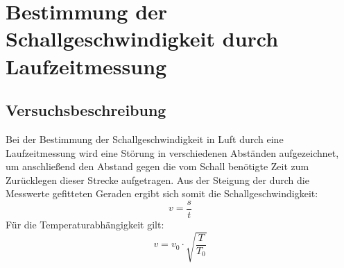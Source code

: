 \documentclass[12pt,a4paper]{article}
\author{Gruppe C14 \\ Julián Häck, Martin Koytek, Lars Wenning, Erik Zimmermann}
\begin{document}
\section{Bestimmung der Schallgeschwindigkeit durch Laufzeitmessung}
\subsection{Versuchsbeschreibung}
Bei der Bestimmung der Schallgeschwindigkeit in Luft durch eine Laufzeitmessung wird eine Störung in verschiedenen Abständen aufgezeichnet, um anschließend den Abstand gegen die vom Schall benötigte Zeit zum Zurücklegen dieser Strecke aufgetragen. Aus der Steigung der durch die Messwerte gefitteten Geraden ergibt sich somit die Schallgeschwindigkeit:
\begin{equation}
v=\frac{s}{t}
\end{equation}
Für die Temperaturabhängigkeit gilt:
\begin{equation}
v=v_0\cdot \sqrt{\frac{T}{T_0}} \label{Temperaturabhängigkeit}
\end{equation} 
\end{document}
